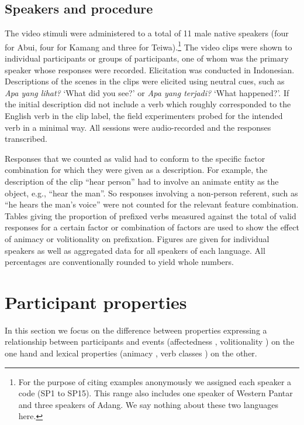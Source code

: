 \subsection{Speakers and procedure}
\label{sec:10:4.2}
The video stimuli were administered to a total of 11 male native speakers (four for Abui, four for Kamang  and three for Teiwa).\footnote{For the purpose of citing examples anonymously we assigned each speaker a code (SP1 to SP15). This range also includes one speaker of Western Pantar and three speakers of Adang. We say nothing about these two languages here.} The video clips were shown to individual participants or groups of participants, one of whom was the primary speaker whose responses were recorded. Elicitation was conducted in Indonesian. Descriptions of the scenes in the clips were elicited using neutral cues, such as \textit{Apa yang lihat?} `What did you see?' or \textit{Apa yang terjadi?} `What happened?'. If the initial description did not include a verb which roughly corresponded to the English verb in the clip label, the field experimenters probed for the intended verb in a minimal way. All sessions were audio-recorded and the responses transcribed.

  Responses that we counted as valid had to conform to the specific factor combination for which they were given as a description. For example, the description of the clip ``hear person'' had to involve an animate entity as the object, e.g., ``hear the man''. So responses involving a non-person referent, such as ``he hears the man's voice'' were not counted for the relevant feature combination. Tables giving the proportion of prefixed verbs measured against the total of valid responses for a certain factor or combination of factors are used to show the effect of animacy or volitionality on prefixation. Figures are given for individual speakers as well as aggregated data for all speakers of each language. All percentages are conventionally rounded to yield whole numbers.

\section{Participant properties}
\label{sec:10:5}
In this section we focus on the difference between properties expressing a relationship between participants and events (affectedness , volitionality ) on the one hand and lexical properties (animacy , verb classes ) on the other.

